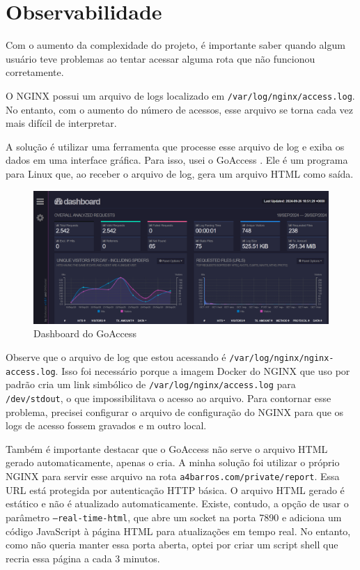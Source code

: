 \chapter{Observabilidade}

Com o aumento da complexidade do projeto, é importante saber quando algum usuário teve problemas ao 
tentar acessar alguma rota que não funcionou corretamente.

O NGINX possui um arquivo de logs localizado em \verb|/var/log/nginx/access.log|. No entanto, com o 
aumento do número de acessos, esse arquivo se torna cada vez mais difícil de interpretar.

A solução é utilizar uma ferramenta que processe esse arquivo de log e exiba os dados em uma 
interface gráfica. Para isso, usei o GoAccess \cite{goaccess}. Ele é um programa para Linux que, 
ao receber o arquivo de log, gera um arquivo HTML como saída.




\begin{figure}[ht]
    \begin{center}
    \includegraphics[width=400pt]{img/dashboard.png}
    \caption{Dashboard do GoAccess}
    \label{fig:cloudflare-stat.png}
    \end{center}
\end{figure}

Observe que o arquivo de log que estou acessando é \verb|/var/log/nginx/nginx-access.log|. Isso foi 
necessário porque a imagem Docker do NGINX que uso por padrão cria um link simbólico de \verb|/var/log/nginx/access.log| 
para \verb|/dev/stdout|, o que impossibilitava o acesso ao arquivo. Para contornar esse problema, 
precisei configurar o arquivo de configuração do NGINX para que os logs de acesso fossem gravados e
m outro local.

Também é importante destacar que o GoAccess não serve o arquivo HTML gerado automaticamente, apenas 
o cria. A minha solução foi utilizar o próprio NGINX para servir esse arquivo na rota \texttt{a4barros.com/private/report}. 
Essa URL está protegida por autenticação HTTP básica. O arquivo HTML gerado é estático e não é 
atualizado automaticamente. Existe, contudo, a opção de usar o parâmetro \texttt{--real-time-html}, 
que abre um socket na porta 7890 e adiciona um código JavaScript à página HTML para atualizações em 
tempo real. No entanto, como não queria manter essa porta aberta, optei por criar um script shell 
que recria essa página a cada 3 minutos.

